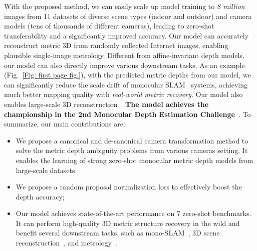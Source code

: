 With the proposed method, we can easily scale up model training to \emph{8 million} images from 11 datasets of diverse scene types (indoor and outdoor) and camera models (tens of thousands of different cameras), leading to zero-shot transferability and a significantly improved accuracy. %
Our model can accurately reconstruct metric 3D from randomly collected Internet images, enabling plausible single-image metrology. 
Different from affine-invariant depth models, our model can also directly improve various downstream tasks.
As an example (Fig.~\ref{Fig: first page fig.}), with the predicted metric depths from our model, we can significantly reduce the scale drift of monocular SLAM~\cite{teed2021droid, sun_2022_TRO} systems, achieving much better mapping quality with \emph{real-world metric recovery}. Our model also enables large-scale 3D reconstruction~\cite{im2019dpsnet}. \textbf{ The model achieves the championship in the 2nd Monocular Depth Estimation Challenge}~\cite{Spencer_2023_CVPR}.
To summarize, our main contributions are:
\begin{itemize}
\itemsep -0.1cm 
    \item We propose a canonical and de-canonical camera transformation method to solve the metric depth ambiguity problems from various cameras setting. It enables the learning of strong zero-shot monocular metric depth models from large-scale datasets. %
    \item We propose a random proposal normalization loss to effectively boost the depth accuracy;
    \item Our model achieves state-of-the-art performance on $7$ zero-shot benchmarks. It can perform high-quality 3D metric structure recovery in the wild and benefit several downstream tasks, such as mono-SLAM~\cite{teed2021droid, mur2017orb}, 3D scene reconstruction~\cite{im2019dpsnet}, and metrology~\cite{zhu2020single}.  
\end{itemize}


